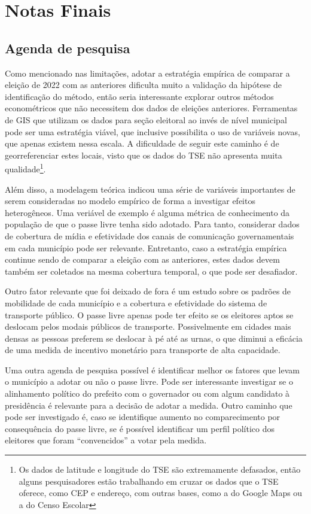 \section{Notas Finais}
\label{sec_notas}

\subsection{Agenda de pesquisa}

Como mencionado nas limitações, adotar a estratégia empírica de comparar a eleição de 2022 com as anteriores dificulta muito a validação da hipótese de identificação do método, então seria interessante explorar outros métodos econométricos que não necessitem dos dados de eleições anteriores. Ferramentas de GIS que utilizam os dados para seção eleitoral ao invés de nível municipal pode ser uma estratégia viável, que inclusive possibilita o uso de variáveis novas, que apenas existem nessa escala. A dificuldade de seguir este caminho é de georreferenciar estes locais, visto que os dados do TSE não apresenta muita qualidade\footnote{Os dados de latitude e longitude do TSE são extremamente defasados, então alguns pesquisadores estão trabalhando em cruzar os dados que o TSE oferece, como CEP e endereço, com outras bases, como a do Google Maps ou a do Censo Escolar}. 

Além disso, a modelagem teórica indicou uma série de variáveis importantes de serem consideradas no modelo empírico de forma a investigar efeitos heterogêneos. Uma veriável de exemplo é alguma métrica de conhecimento da população de que o passe livre tenha sido adotado. Para tanto, considerar dados de cobertura de mídia e efetividade dos canais de comunicação governamentais em cada município pode ser relevante. Entretanto, caso a estratégia empírica continue sendo de comparar a eleição com as anteriores, estes dados devem também ser coletados na mesma cobertura temporal, o que pode ser desafiador. 

Outro fator relevante que foi deixado de fora é um estudo sobre os padrões de mobilidade de cada município e a cobertura e efetividade do sistema de transporte público. O passe livre apenas pode ter efeito se os eleitores aptos se deslocam pelos modais públicos de transporte. Possivelmente em cidades mais densas as pessoas preferem se deslocar à pé até as urnas, o que diminui a eficácia de uma medida de incentivo monetário para transporte de alta capacidade.

Uma outra agenda de pesquisa possível é identificar melhor os fatores que levam o município a adotar ou não o passe livre. Pode ser interessante investigar se o alinhamento político do prefeito com o governador ou com algum candidato à presidência é relevante para a decisão de adotar a medida. Outro caminho que pode ser investigado é, caso se identifique aumento no comparecimento por consequência do passe livre, se é possível identificar um perfil político dos eleitores que foram ``convencidos'' a votar pela medida.

